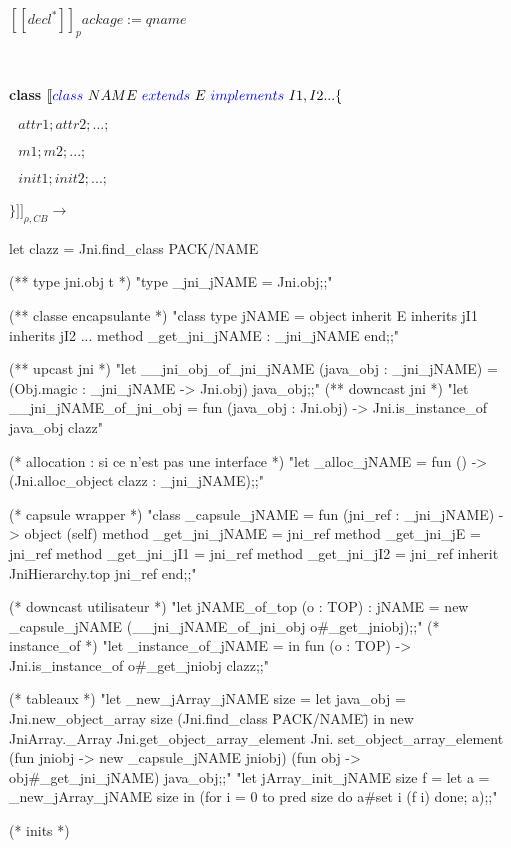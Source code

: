 \documentclass[a4paper, 11pt]{report}
\begin{document}
$[\![ decl^* ]\!]_package:=qname$ 

\ 
\newline

\textbf{class}
\newline
\noindent
$[\![ {\color{blue}class}\ NAME\ 
 {\color{blue}extends}\  E \ 
 {\color{blue}implements}\  I1,I2... \{$

 $ \ \ \ attr1; attr2; ...;$

  $\ \ \ m1; m2; ...;$

  $\ \ \ init1; init2; ...;$

 $\} ]\!]_{\rho,CB}\longrightarrow$
\ 
\newline

\begin{OCaml}
let clazz = Jni.find_class PACK/NAME

(** type jni.obj t *)
"type _jni_jNAME = Jni.obj;;"

(** classe encapsulante *)
"class type jNAME =
   object inherit E
   inherits jI1
   inherits jI2 ...
   method _get_jni_jNAME : _jni_jNAME
   end;;"

(** upcast jni *)
"let __jni_obj_of_jni_jNAME (java_obj : _jni_jNAME) =
   (Obj.magic : _jni_jNAME -> Jni.obj) java_obj;;"
(** downcast jni *)
"let __jni_jNAME_of_jni_obj =
   fun (java_obj : Jni.obj) ->
     Jni.is_instance_of java_obj clazz"
 
(* allocation : si ce n'est pas une interface *)
 "let _alloc_jNAME =
     fun () -> (Jni.alloc_object clazz : _jni_jNAME);;"

(* capsule wrapper *)
"class _capsule_jNAME = fun (jni_ref : _jni_jNAME) ->
    object (self)
      method _get_jni_jNAME = jni_ref
      method _get_jni_jE = jni_ref
      method _get_jni_jI1 = jni_ref
      method _get_jni_jI2 = jni_ref
      inherit JniHierarchy.top jni_ref
    end;;"

(* downcast utilisateur *)
"let jNAME_of_top (o : TOP) : jNAME =
    new _capsule_jNAME (__jni_jNAME_of_jni_obj o#_get_jniobj);;"
(* instance_of *)
"let _instance_of_jNAME =
    in fun (o : TOP) -> Jni.is_instance_of o#_get_jniobj clazz;;"

(* tableaux *)
"let _new_jArray_jNAME size =
    let java_obj = Jni.new_object_array size (Jni.find_class \"PACK/NAME\")
    in
      new JniArray._Array Jni.get_object_array_element Jni.
        set_object_array_element (fun jniobj -> new _capsule_jNAME jniobj)
        (fun obj -> obj#_get_jni_jNAME) java_obj;;"
"let jArray_init_jNAME size f =
    let a = _new_jArray_jNAME size
    in (for i = 0 to pred size do a#set i (f i) done; a);;"

(* inits *)
\end{OCaml}
\end{document}
